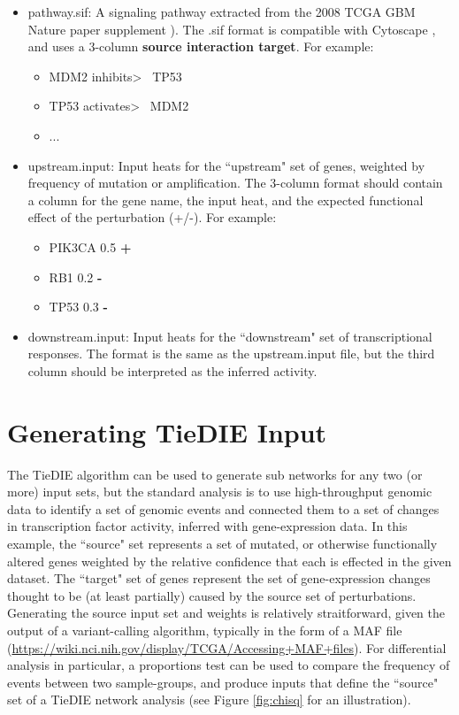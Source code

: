 \documentclass[11pt]{report}
\begin{document}
	\begin{itemize}
	\item pathway.sif: A signaling pathway extracted from the 2008 TCGA GBM Nature paper supplement \cite{TCGA08}). The .sif format is
	compatible with Cytoscape \cite{Cytoscape}, and uses a 3-column \textbf{source interaction target}. For example: 
	\begin{itemize}	
	
		\item MDM2	inhibits\textgreater	~ TP53
		\item TP53	activates\textgreater	~ MDM2
		\item ...
	\end{itemize}
	
	\item upstream.input: Input heats for the ``upstream" set of genes, weighted by frequency of mutation or amplification. The 3-column format
	should contain a column for the gene name, the input heat, and the expected functional effect of the perturbation (+/-). For example:
	\begin{itemize}	
		\item PIK3CA	0.5	\textbf{+}
		\item RB1	0.2	 \textbf{-}
		\item TP53 0.3   \textbf{-}
	\end{itemize}	
	\item downstream.input: Input heats for the ``downstream" set of transcriptional responses. The format is the same as the upstream.input file,
	but the third column should be interpreted as the inferred activity. 

	\end{itemize}

\section{Generating TieDIE Input}

\noindent The TieDIE algorithm can be used to generate sub networks for any two (or more) input sets, but the standard analysis is to 
use high-throughput genomic data to identify a set of genomic events and connected them to a set of changes in transcription
factor activity, inferred with gene-expression data. In this example, the ``source" set represents a set of mutated, or otherwise functionally altered genes 
weighted by the relative confidence that each is effected in the given dataset. The ``target" set of genes represent the set of gene-expression changes thought to be
 (at least partially) caused by the source set of perturbations. Generating the source input set and weights is relatively straitforward, given the output of a variant-calling algorithm, typically in the form of a MAF file (\url{https://wiki.nci.nih.gov/display/TCGA/Accessing+MAF+files}). 
For differential analysis in particular, a proportions test can be used to compare the frequency of events between two sample-groups, 
and produce inputs that define the ``source" set of a TieDIE network analysis (see Figure \ref{fig:chisq} for an illustration).  
\end{document}
